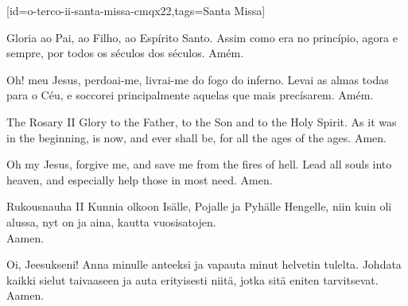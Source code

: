 [id={o-terco-ii-santa-missa-cmqx22},tags={Santa Missa}]
  \begin{passage}[PT]{}
    Gloria ao Pai, ao Filho, ao Espírito Santo.
    Assim como era no princípio, agora e sempre,
    por todos os séculos dos séculos. Amém.
    \par
    Oh! meu Jesus, perdoai-me, livrai-me do fogo do
    inferno. Levai as almas todas para o Céu, e soccorei
    principalmente aquelas que mais precísarem. Amém.
  \end{passage}
  \begin{passage}[EN]{The Rosary II}
    Glory to the Father, to the Son and to the Holy Spirit.
    As it was in the beginning, is now, and ever shall be,
    for all the ages of the ages. Amen.
    \par
    Oh my Jesus, forgive me, and save me from the fires
    of hell. Lead all souls into heaven, and especially
    help those in most need. Amen.
  \end{passage}
  \begin{passage}[FI]{Rukousnauha II}
    Kunnia olkoon Isälle, Pojalle ja Pyhälle Hengelle,
    niin kuin oli alussa, nyt on ja aina,
    kautta vuosisatojen.\\
    Aamen.
    \par
    Oi, Jeesukseni! Anna minulle anteeksi ja vapauta
    minut helvetin tulelta. Johdata kaikki
    sielut taivaaseen ja auta erityisesti niitä,
    jotka sitä eniten tarvitsevat. Aamen.
  \end{passage}
\endsong


